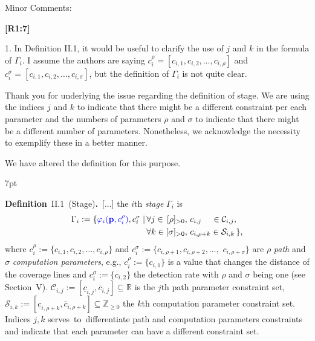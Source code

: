 \documentclass[10pt]{letter}
\newenvironment{formal}{%
  \def\FrameCommand{%
    \hspace{1pt}%
    {\color{red}\vrule width 2pt}%
    {\color{formalshade}\vrule width 4pt}%
    \colorbox{formalshade}%
  }%
  \MakeFramed{\advance\hsize-\width\FrameRestore}%
  \noindent\hspace{-4.55pt}%
  \begin{adjustwidth}{}{7pt}%
  \vspace{2pt}\vspace{2pt}%
}
{%
  \vspace{2pt}\end{adjustwidth}\endMakeFramed%
}
\begin{document}
\vspace{2em}


Minor Comments:

{\hspace*{-4.5em}\textbf{[R1:7]}\vspace*{-1.9em}}

1. In Definition II.1, it would be useful to clarify the use of $j$ and $k$ in the formula of $\Gamma_i$. I assume the authors are saying $c^\rho_i=[c_{i,1},c_{i,2},\dots,c_{i,\rho}]$ and $c^\sigma_i=[c_{i,1},c_{i,2},\dots,c_{i,\sigma}]$, but the definition of $\Gamma_i$ is not quite clear.

{\color{blue} 

{\hspace*{-4.5em}{[R1:7]}\vspace*{-1.9em}}

Thank you for underlying the issue regarding the definition of stage. We are using the indices $j$ and $k$ to indicate that there might be a different constraint per each parameter and the numbers of parameters $\rho$ and $\sigma$ to indicate that there might be a different number of parameters. Nonetheless, we acknowledge the necessity to exemplify these in a better manner.

We have altered the definition for this purpose.

\begin{formal}
  \color{black} 
  \textbf{Definition}~II.1~(Stage)\textbf{.}~[...] the $i$th \emph{stage} $\Gamma_i$ %
    is
  \begin{equation*}\begin{split}
      \Gamma_i:=\{{\color{blue}\varphi_i(\mathbf{p}%
      ,c_i^\rho)},c_i^\sigma\mid
      \,&\forall j\in\,[\rho]_{>0},\,c_{i,j}\,\,\,\,\,\,\,\in\mathcal{C}_{i,j},\,\\
        &\forall k\in[\sigma]_{>0},\,c_{i,\rho+k}\in\mathcal{S}_{i,k}\,\},
  \end{split}\end{equation*}
  where $c_i^\rho${\color{blue}$:=\{c_{i,1},c_{i,2},\dots,c_{i,\rho}\}$} and $c_i^\sigma${\color{blue}$:=\{c_{i,\rho+1},c_{i,\rho+2},\dots,$ $c_{i,\rho+\sigma}\}$} are $\rho$ \emph{path} and $\sigma$ \emph{computation parameters}{\color{blue}, e.g., $c_i^\rho:=\{c_{i,1}\}$ is a value that changes the distance of the coverage lines and $c^\sigma_i:=\{c_{i,2}\}$ the detection rate with $\rho$ and $\sigma$ being one (see Section~{\color{red}V})}. $\mathcal{C}_{i,j}:=[\underline{c}_{i,j},\overline{c}_{i,j}]\subseteq\mathbb{R}$ is the $j$th path parameter %
  constraint set, %
  $\mathcal{S}_{i,k}:=[\underline{c}_{i,\rho+k},\overline{c}_{i,\rho+k}]\subseteq\mathbb{Z}_{\geq 0}$ %
  the $k$th computation parameter constraint set. {\color{blue}Indices $j,k$ serves~to~differentiate path and computation parameters constraints and indicate that each parameter can have a different constraint set.}
  \vspace*{1ex}
\end{formal}

}
\end{document}
